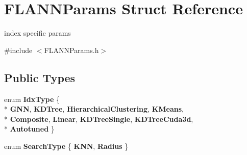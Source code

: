 \hypertarget{structFLANNParams}{\section{F\-L\-A\-N\-N\-Params Struct Reference}
\label{structFLANNParams}
}


index specific params  




{\ttfamily \#include $<$F\-L\-A\-N\-N\-Params.\-h$>$}

\subsection*{Public Types}
\begin{DoxyCompactItemize}
\item 
enum {\bfseries Idx\-Type} \{ \\*
{\bfseries G\-N\-N}, 
{\bfseries K\-D\-Tree}, 
{\bfseries Hierarchical\-Clustering}, 
{\bfseries K\-Means}, 
\\*
{\bfseries Composite}, 
{\bfseries Linear}, 
{\bfseries K\-D\-Tree\-Single}, 
{\bfseries K\-D\-Tree\-Cuda3d}, 
\\*
{\bfseries Autotuned}
 \}
\item 
enum {\bfseries Search\-Type} \{ {\bfseries K\-N\-N}, 
{\bfseries Radius}
 \}
\end{DoxyCompactItemize}
